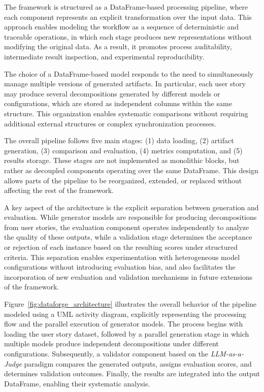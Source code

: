\documentclass[pdflatex,sn-mathphys-num]{sn-jnl}
\theoremstyle{thmstyleone}%
\theoremstyle{thmstyletwo}%
\theoremstyle{thmstylethree}%
\begin{document}
The framework is structured as a DataFrame-based processing pipeline, where each component represents an explicit transformation over the input data. This approach enables modeling the workflow as a sequence of deterministic and traceable operations, in which each stage produces new representations without modifying the original data. As a result, it promotes process auditability, intermediate result inspection, and experimental reproducibility.

The choice of a DataFrame-based model responds to the need to simultaneously manage multiple versions of generated artifacts. In particular, each user story may produce several decompositions generated by different models or configurations, which are stored as independent columns within the same structure. This organization enables systematic comparisons without requiring additional external structures or complex synchronization processes.

The overall pipeline follows five main stages: (1) data loading, (2) artifact generation, (3) comparison and evaluation, (4) metrics computation, and (5) results storage. These stages are not implemented as monolithic blocks, but rather as decoupled components operating over the same DataFrame. This design allows parts of the pipeline to be reorganized, extended, or replaced without affecting the rest of the framework.

A key aspect of the architecture is the explicit separation between generation and evaluation. While generator models are responsible for producing decompositions from user stories, the evaluation component operates independently to analyze the quality of these outputs, while a validation stage determines the acceptance or rejection of each instance based on the resulting scores under structured criteria. This separation enables experimentation with heterogeneous model configurations without introducing evaluation bias, and also facilitates the incorporation of new evaluation and validation mechanisms in future extensions of the framework.

Figure~\ref{fig:dataforge_architecture} illustrates the overall behavior of the pipeline modeled using a UML activity diagram, explicitly representing the processing flow and the parallel execution of generator models. The process begins with loading the user story dataset, followed by a parallel generation stage in which multiple models produce independent decompositions under different configurations. Subsequently, a validator component based on the \textit{LLM-as-a-Judge} paradigm compares the generated outputs, assigns evaluation scores, and determines validation outcomes. Finally, the results are integrated into the output DataFrame, enabling their systematic analysis.
\end{document}
